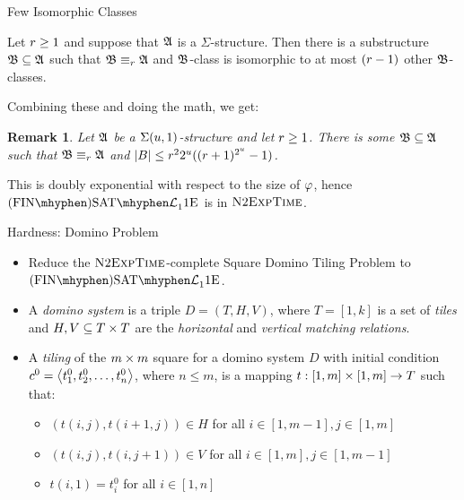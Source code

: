 \documentclass{beamer}
\newtheorem{remark}{Remark}
\begin{document}
\begin{frame}{Few Isomorphic Classes}
\begin{lemma}
Let $r \geq 1$ and suppose that $\mathfrak{A}$ is a $\Sigma$-structure.
Then there is a substructure $\mathfrak{B}\subseteq\mathfrak{A}$ such that
$\mathfrak{B}\equiv_{r}\mathfrak{A}$ and $\mathfrak{B}$-class is isomorphic to at most $(r-1)$
other $\mathfrak{B}$-classes.
\end{lemma}

Combining these and doing the math, we get:
\begin{remark}
Let $\mathfrak{A}$ be a $\Sigma(u,1)$-structure and let $r\geq1$.
There is some $\mathfrak{B}\subseteq\mathfrak{A}$ such that $\mathfrak{B}\equiv_{r}\mathfrak{A}$ and
$\left|B\right| \leq r^2 2^u ((r+1)^{2^u}-1)$.
\end{remark}

This is doubly exponential with respect to the size of $\varphi$, hence
$\FinASat{\Lvp\LL\nonv1\Eea1\noag}$ is in $\text{\normalfont{\scshape N}}2\text{\normalfont{\scshape ExpTime}}$.
\end{frame}

\begin{frame}{Hardness: Domino Problem}
\begin{itemize}
  \item 
Reduce the $\text{\normalfont{\scshape N}}2\text{\normalfont{\scshape ExpTime}}$-complete Square Domino Tiling Problem to
$\FinASat{\Lvp\LL\nonv1\Eea1\noag}$.

\item
A \emph{domino system} is a triple $D = (T,H,V)$, where
$T = [1,k]$ is a set of \emph{tiles} and $H,V\subseteq T\times T$ are the
\emph{horizontal} and \emph{vertical matching relations}.

\item
A \emph{tiling} of the $m\times m$ square for a domino system $D$ with initial
condition $c^0 = \left\langle t_1^0,t_2^0,\dots,t_n^0 \right\rangle$, where $n\leq m$, is a mapping
$t : [1,m]\times [1,m]\to T$ such that:
\begin{itemize}
  \item $(t(i,j),t(i+1,j))\in H$ for all $i\in[1,m-1], j\in[1,m]$
  \item $(t(i,j),t(i,j+1))\in V$ for all $i\in[1,m], j\in[1,m-1]$
  \item $t(i,1) = t_i^0$ for all $i\in[1,n]$
\end{itemize}
\end{itemize}
\end{frame}
\end{document}
